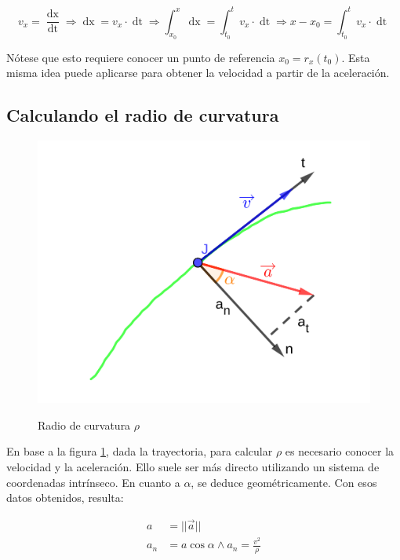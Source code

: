 \documentclass{article}
\begin{document}
\begin{equation}
v_x = \frac{ \mathop{dx} }{ \mathop{dt} } \Rightarrow \mathop{ dx } = v_x \cdot \mathop{ dt } \Rightarrow \int_{x_0}^x \mathop{ dx } = \int_{t_0}^t v_x \cdot \mathop{ dt } \Rightarrow x - x_0 = \int_{t_0}^t v_x \cdot \mathop{ dt }
\end{equation}

Nótese que esto requiere conocer un punto de referencia $x_0 = r_x(t_0)$. Esta misma idea puede aplicarse para obtener la velocidad a partir de la aceleración.

\subsection{Calculando el radio de curvatura}

\begin{figure}[ht]
\centering
\caption{Radio de curvatura $\rho$}
\includegraphics[scale=1.3]{../../common/img/62.01/theory/02-kinematics-rho.png}
\label{fig:rho}
\end{figure}

En base a la figura \ref{fig:rho}, dada la trayectoria, para calcular $\rho$ es necesario conocer la velocidad y la aceleración. Ello suele ser más directo utilizando un sistema de coordenadas intrínseco. En cuanto a $\alpha$, se deduce geométricamente. Con esos datos obtenidos, resulta:

\begin{subequations}
\begin{align}
a &= ||\overrightarrow{a}|| \\
a_n &= a \cos \alpha \wedge a_n = \frac{v^2}{\rho}
\end{align}
\end{subequations}
\end{document}
